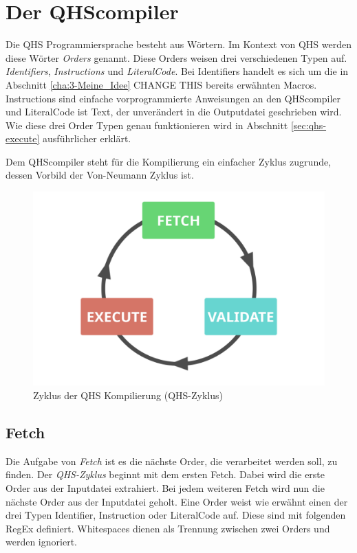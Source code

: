 \chapter{Der QHScompiler} \label{cha:4-QHS_Compiler}
Die QHS Programmiersprache besteht aus Wörtern. Im Kontext von QHS werden diese Wörter \textit{Orders} genannt. Diese Orders weisen drei verschiedenen Typen auf. \textit{Identifiers}, \textit{Instructions} und \textit{LiteralCode}.
Bei Identifiers handelt es sich um die in Abschnitt \ref{cha:3-Meine_Idee} CHANGE THIS bereits erwähnten Macros. Instructions sind einfache vorprogrammierte Anweisungen an den QHScompiler und LiteralCode ist Text, der unverändert
in die Outputdatei geschrieben wird. Wie diese drei Order Typen genau funktionieren wird in Abschnitt \ref{sec:qhs-execute} ausführlicher erklärt.

Dem QHScompiler steht für die Kompilierung ein einfacher Zyklus zugrunde, dessen Vorbild der Von-Neumann Zyklus ist.

\begin{figure}[h!]
    \centering
    \includegraphics[scale=0.6]{resources/images/qhs-cycle.png}
    \caption{Zyklus der QHS Kompilierung (QHS-Zyklus)}
    \label{fig:qhs-cycle}
\end{figure}

\section{Fetch} \label{sec:qhs-fetch}
Die Aufgabe von \textit{Fetch} ist es die nächste Order, die verarbeitet werden soll, zu finden.
Der \textit{QHS-Zyklus} beginnt mit dem ersten Fetch. Dabei wird die erste Order aus der Inputdatei extrahiert. Bei jedem weiteren Fetch wird nun die nächste Order aus der Inputdatei geholt.
Eine Order weist wie erwähnt einen der drei Typen Identifier, Instruction oder LiteralCode auf.
Diese sind mit folgenden RegEx definiert. Whitespaces dienen als Trennung zwischen zwei Orders und werden ignoriert.

